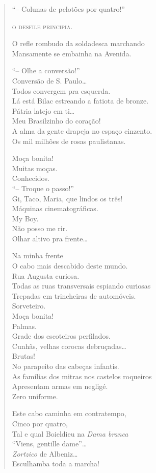\begin{verse} %
``-- Colunas de pelotões por quatro!''

\textsc{o desfile principia.}

O refle rombudo da soldadesca marchando\\
Mansamente se embainha na Avenida.

``-- Olhe a conversão!''\\
Conversão de S. Paulo\ldots{}\\
Todos convergem pra esquerda.\\
Lá está Bilac estreando a fatiota de bronze.\\
Pátria latejo em ti\ldots{}\\
Meu Brasilzinho do coração!\\
A alma da gente drapeja no espaço cinzento.\\
Os mil milhões de rosas paulistanas.

Moça bonita!\\
Muitas moças.\\
Conhecidos.\\
``-- Troque o passo!''\\
Gi, Taco, Maria, que lindos os três!\\
Máquinas cinematográficas.\\
My Boy.\\
Não posso me rir.\\
Olhar altivo pra frente\ldots{}

Na minha frente\\
O cabo mais descabido deste mundo.\\
Rua Augusta curiosa.\\
Todas as ruas transversais espiando curiosas\\
Trepadas em trincheiras de automóveis.\\
Sorveteiro.\\
Moça bonita!\\
Palmas.\\
Grade dos escoteiros perfilados.\\
Cunhãs, velhas corocas debruçadas\ldots{}\\
Brutas!\\
No parapeito das cabeças infantis.\\
As famílias dos mitras nos castelos roqueiros\\
Apresentam armas em negligé.\\
Zero uniforme.

Este cabo caminha em contratempo,\\
Cinco por quatro,\\
Tal e qual Boieldieu na \emph{Dama branca}\\
``Viens, gentille dame''\ldots{}\\
\emph{Zortzico} de Albeniz\ldots{}\\
Esculhamba toda a marcha!


\end{verse}
